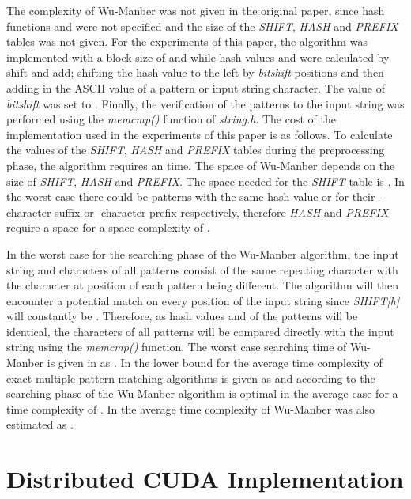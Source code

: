 \documentclass{ws-ijait}
\begin{document}
The complexity of Wu-Manber was not given in the original paper, since hash functions  and  were not specified and the size of the \textit{SHIFT}, \textit{HASH} and \textit{PREFIX} tables was not given.\cite{Navarro2002} For the experiments of this paper, the algorithm was implemented with a block size of  and  while hash values  and  were calculated by shift and add; shifting the hash value to the left by \textit{bitshift} positions and then adding in the ASCII value of a pattern or input string character. The value of \textit{bitshift} was set to . Finally, the verification of the patterns to the input string was performed using the \textit{memcmp()} function of \textit{string.h}. The cost of the implementation used in the experiments of this paper is as follows. To calculate the values of the \textit{SHIFT}, \textit{HASH} and \textit{PREFIX} tables during the preprocessing phase, the algorithm requires an  time. The space of Wu-Manber depends on the size of \textit{SHIFT}, \textit{HASH} and \textit{PREFIX}. The space needed for the \textit{SHIFT} table is . In the worst case there could be  patterns with the same hash value  or  for their -character suffix or -character prefix respectively, therefore \textit{HASH} and \textit{PREFIX} require a  space for a space complexity of .

In the worst case for the searching phase of the Wu-Manber algorithm, the input string and  characters of all  patterns consist of the same repeating character  with the character at position  of each pattern being different. The algorithm will then encounter a potential match on every position of the input string since \textit{SHIFT[h]} will constantly be . Therefore, as hash values  and  of the patterns will be identical, the  characters of all  patterns will be compared directly with the input string using the \textit{memcmp()} function. The worst case searching time of Wu-Manber is given in \cite{Chen2005} as . In \cite{Navarro2004} the lower bound for the average time complexity of exact multiple pattern matching algorithms is given as  and according to \cite{Chen2005} the searching phase of the Wu-Manber algorithm is optimal in the average case for a time complexity of . In \cite{Liu2005} the average time complexity of Wu-Manber was also estimated as .


\section{Distributed CUDA Implementation}
\label{sec:distrcudawm}
\end{document}
